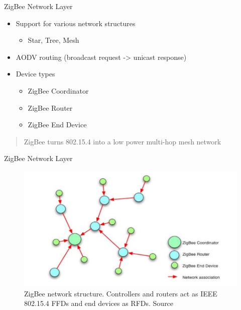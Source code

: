 \documentclass{beamer}
\begin{document}
\begin{frame}{ZigBee Network Layer}
  \begin{itemize}
  	\item Support for various network structures
  	\begin{itemize}
  		\item Star, Tree, Mesh
  	\end{itemize}
  	\item AODV routing (broadcast request -> unicast response)
  	\item Device types
  	\begin{itemize}
  		\item ZigBee Coordinator
  		\item ZigBee Router
  		\item ZigBee End Device
  	\end{itemize}
  \end{itemize}
  
  \begin{quotation}
	ZigBee turns 802.15.4 into a low power multi-hop mesh network
  \end{quotation}
\end{frame}

\begin{frame}{ZigBee Network Layer}
  \begin{figure}
  \includegraphics[width=\textwidth]{zbnetstructure.png}
  \caption{ZigBee network structure. Controllers and routers act as IEEE 802.15.4 FFDs and end devices as RFDs. Source \cite{zbslides}}
  \end{figure}
\end{frame}
\end{document}
